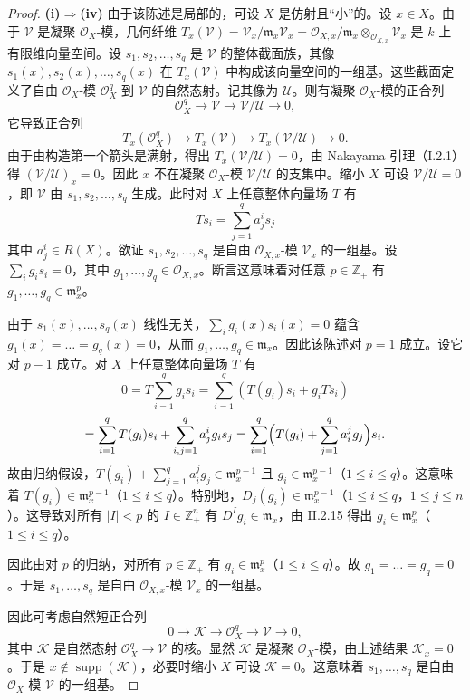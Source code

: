 \begin{proof}
\textbf{(i)$\Rightarrow$(iv)} 由于该陈述是局部的，可设 $X$ 是仿射且“小”的。设 $x\in X$。由于 $\mathcal{V}$ 是凝聚 $\mathcal{O}_X$-模，几何纤维
$T_x(\mathcal{V})=\mathcal{V}_x/\mathfrak{m}_x\mathcal{V}_x=\mathcal{O}_{X,x}/\mathfrak{m}_x\otimes_{\mathcal{O}_{X,x}}\mathcal{V}_x$
是 $k$ 上有限维向量空间。设 $s_1,s_2,\dots,s_q$ 是 $\mathcal{V}$ 的整体截面族，其像 $s_1(x),s_2(x),\dots,s_q(x)$ 在 $T_x(\mathcal{V})$ 中构成该向量空间的一组基。这些截面定义了自由 $\mathcal{O}_X$-模 $\mathcal{O}_X^q$ 到 $\mathcal{V}$ 的自然态射。记其像为 $\mathcal{U}$。则有凝聚 $\mathcal{O}_X$-模的正合列
$$\mathcal{O}_X^q\longrightarrow\mathcal{V}\longrightarrow\mathcal{V}/\mathcal{U}\longrightarrow0,$$
它导致正合列
$$T_x(\mathcal{O}_X^q)\longrightarrow T_x(\mathcal{V})\longrightarrow T_x(\mathcal{V}/\mathcal{U})\longrightarrow0.$$
由于由构造第一个箭头是满射，得出 $T_x(\mathcal{V}/\mathcal{U})=0$，由 Nakayama 引理（I.2.1）得 $(\mathcal{V}/\mathcal{U})_x=0$。因此 $x$ 不在凝聚 $\mathcal{O}_X$-模 $\mathcal{V}/\mathcal{U}$ 的支集中。缩小 $X$ 可设 $\mathcal{V}/\mathcal{U}=0$，即 $\mathcal{V}$ 由 $s_1,s_2,\dots,s_q$ 生成。此时对 $X$ 上任意整体向量场 $T$ 有
$$Ts_i=\sum_{j=1}^q a^i_js_j$$
其中 $a^i_j\in R(X)$。欲证 $s_1,s_2,\dots,s_q$ 是自由 $\mathcal{O}_{X,x}$-模 $\mathcal{V}_x$ 的一组基。设 $\sum_i g_is_i=0$，其中 $g_1,\dots,g_q\in\mathcal{O}_{X,x}$。断言这意味着对任意 $p\in\mathbb{Z}_+$ 有 $g_1,\dots,g_q\in\mathfrak{m}_x^p$。

由于 $s_1(x),\dots,s_q(x)$ 线性无关，$\sum_i g_i(x)s_i(x)=0$ 蕴含
$g_1(x)=\dots=g_q(x)=0$，从而 $g_1,\dots,g_q\in\mathfrak{m}_x$。因此该陈述对 $p=1$ 成立。设它对 $p-1$ 成立。对 $X$ 上任意整体向量场 $T$ 有
$$0=T\sum_{i=1}^qg_is_i=\sum_{i=1}^q(T(g_i)s_i+g_iTs_i)$$
$$=\sum_{i=1}^qT(g_i)s_i+\sum_{i,j=1}^q a_j^ig_is_j
=\sum_{i=1}^q\Bigl(T(g_i)+\sum_{j=1}^qa_i^jg_j\Bigr)s_i.$$
故由归纳假设，$T(g_i)+\sum_{j=1}^qa_i^jg_j\in\mathfrak{m}_x^{p-1}$ 且 $g_i\in\mathfrak{m}_x^{p-1}$（$1\le i\le q$）。这意味着 $T(g_i)\in\mathfrak{m}_x^{p-1}$（$1\le i\le q$）。特别地，$D_j(g_i)\in\mathfrak{m}_x^{p-1}$（$1\le i\le q$，$1\le j\le n$）。这导致对所有 $|I|<p$ 的 $I\in\mathbb{Z}_+^n$ 有 $D^Ig_i\in\mathfrak{m}_x$，由 II.2.15 得出 $g_i\in\mathfrak{m}_x^p$（$1\le i\le q$）。

因此由对 $p$ 的归纳，对所有 $p\in\mathbb{Z}_+$ 有 $g_i\in\mathfrak{m}_x^p$（$1\le i\le q$）。故 $g_1=\dots=g_q=0$。于是 $s_1,\dots,s_q$ 是自由 $\mathcal{O}_{X,x}$-模 $\mathcal{V}_x$ 的一组基。

因此可考虑自然短正合列
$$0\longrightarrow\mathcal{K}\longrightarrow\mathcal{O}_X^q\longrightarrow\mathcal{V}\longrightarrow0,$$
其中 $\mathcal{K}$ 是自然态射 $\mathcal{O}_X^q\to\mathcal{V}$ 的核。显然 $\mathcal{K}$ 是凝聚 $\mathcal{O}_X$-模，由上述结果 $\mathcal{K}_x=0$。于是 $x\notin\operatorname{supp}(\mathcal{K})$，必要时缩小 $X$ 可设 $\mathcal{K}=0$。这意味着 $s_1,\dots,s_q$ 是自由 $\mathcal{O}_X$-模 $\mathcal{V}$ 的一组基。
\end{proof}

